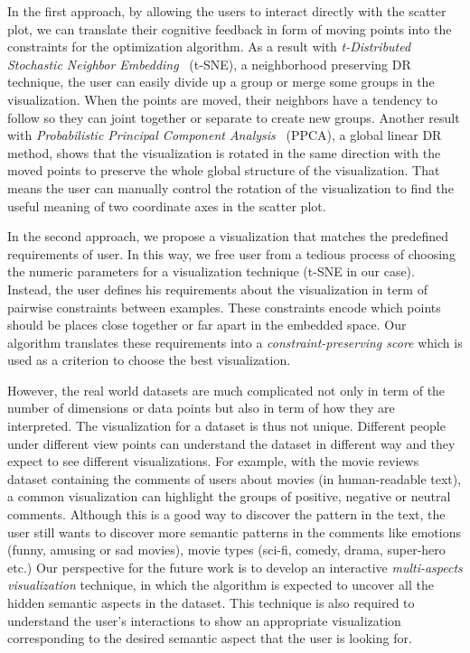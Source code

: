 In the first approach, by allowing the users to interact directly with the scatter plot, we can translate their cognitive feedback in form of moving points into the constraints for the optimization algorithm.
As a result with \emph{t-Distributed Stochastic Neighbor Embedding}~\cite{maaten2008tsne} (t-SNE), a neighborhood preserving DR technique, the user can easily divide up a group or merge some groups in the visualization.
When the points are moved, their neighbors have a tendency to follow so they can joint together or separate to create new groups.
Another result with \emph{Probabilistic Principal Component Analysis}~\cite{tipping1999ppca} (PPCA), a global linear DR method, shows that the visualization is rotated in the same direction with the moved points to preserve the whole global structure of the visualization. That means the user can manually control the rotation of the visualization to find the useful meaning of two coordinate axes in the scatter plot.

In the second approach, we propose a visualization that matches the predefined requirements of user.
In this way, we free user from a tedious process of choosing the numeric parameters for a visualization technique (t-SNE in our case).
Instead, the user defines his requirements about the visualization in term of pairwise constraints between examples.
These constraints encode which points should be places close together or far apart in the embedded space.
Our algorithm translates these requirements into a \emph{constraint-preserving score} which is used as a criterion to choose the best visualization.

However, the real world datasets are much complicated not only in term of the number of dimensions or data points but also in term of how they are interpreted.
The visualization for a dataset is thus not unique. Different people under different view points can understand the dataset in different way and they expect to see different visualizations.
For example, with the movie reviews dataset containing the comments of users about movies (in human-readable text), a common visualization can highlight the groups of positive, negative or neutral comments.
Although this is a good way to discover the pattern in the text, the user still wants to discover more semantic patterns in the comments like emotions (funny, amusing or sad movies), movie types (sci-fi, comedy, drama, super-hero etc.)
Our perspective for the future work is to develop an interactive \emph{multi-aspects visualization} technique, in which the algorithm is expected to uncover all the hidden semantic aspects in the dataset.
This technique is also required to understand the user's interactions to show an appropriate visualization corresponding to the desired semantic aspect that the user is looking for.